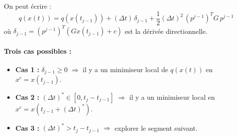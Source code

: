 On peut écrire :
\begin{equation}
    q(x(t)) = q(x(t_{j-1})) + (\Delta t) \, \delta_{j-1} + \frac{1}{2} (\Delta t)^2 \, (p^{j-1})^T G \, p^{j-1}
\end{equation}
où $\delta_{j-1} = (p^{j-1})^T (G x(t_{j-1}) + c)$ est la dérivée directionnelle.

\paragraph{Trois cas possibles :}
\begin{itemize}
    \item \textbf{Cas 1 :} $\delta_{j-1} \ge 0$ $\Rightarrow$ il y a un minimiseur local de $q(x(t))$ en $x^c = x(t_{j-1})$.
    \item \textbf{Cas 2 :} $(\Delta t)^* \in [0, t_j - t_{j-1}]$ $\Rightarrow$ il y a un minimiseur local en $x^c = x(t_{j-1} + (\Delta t)^*)$.
    \item \textbf{Cas 3 :} $(\Delta t)^* > t_j - t_{j-1}$ $\Rightarrow$ explorer le segment suivant.
\end{itemize}

